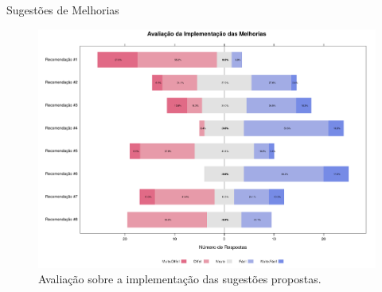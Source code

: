 \documentclass[t,14pt,mathserif]{beamer}
\begin{document}
\begin{frame}{Sugestões de Melhorias}

\begin{figure}[htpb]
    \centering
    \includegraphics[width=.9\linewidth]{../img/plot_likert_avaliacao_implementacao_melhorias.pdf}
    \caption{Avaliação sobre a implementação das sugestões propostas.}
\label{fig:plot_likert_avaliacao_implementacao_melhorias}
\end{figure}

\end{frame}
\end{document}
